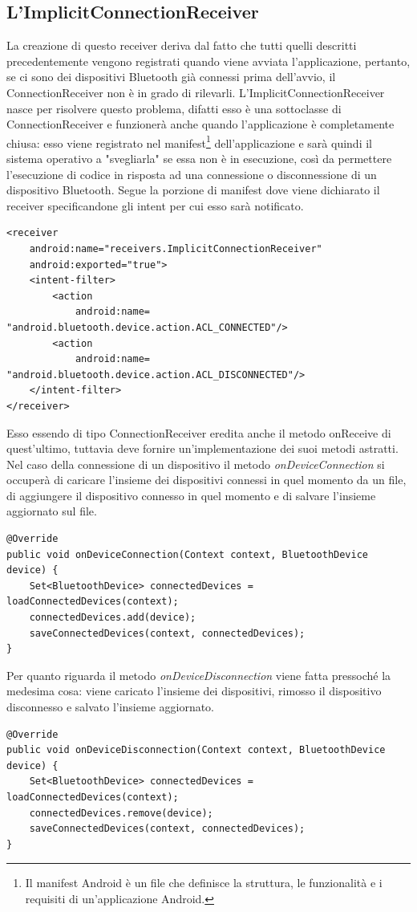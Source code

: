 \subsection{L'ImplicitConnectionReceiver}
La creazione di questo receiver deriva dal fatto che tutti quelli descritti precedentemente vengono registrati quando viene avviata l'applicazione, pertanto, se ci sono dei dispositivi Bluetooth già connessi prima dell'avvio, il ConnectionReceiver non è in grado di rilevarli. L'ImplicitConnectionReceiver nasce per risolvere questo problema, difatti esso è una sottoclasse di ConnectionReceiver e funzionerà anche quando l'applicazione è completamente chiusa: esso viene registrato nel manifest\footnote{Il manifest Android è un file che definisce la struttura, le funzionalità e i requisiti di un'applicazione Android.} dell'applicazione e sarà quindi il sistema operativo a "svegliarla" se essa non è in esecuzione, così da permettere l'esecuzione di codice in risposta ad una connessione o disconnessione di un dispositivo Bluetooth. Segue la porzione di manifest dove viene dichiarato il receiver specificandone gli intent per cui esso sarà notificato.
\begin{verbatim}
<receiver 
    android:name="receivers.ImplicitConnectionReceiver"
    android:exported="true">
    <intent-filter>
        <action 
            android:name= "android.bluetooth.device.action.ACL_CONNECTED"/>
        <action
            android:name= "android.bluetooth.device.action.ACL_DISCONNECTED"/>
    </intent-filter>
</receiver>
\end{verbatim}

Esso essendo di tipo ConnectionReceiver eredita anche il metodo onReceive di quest'ultimo, tuttavia deve fornire un'implementazione dei suoi metodi astratti. Nel caso della connessione di un dispositivo il metodo \textit{onDeviceConnection} si occuperà di caricare l'insieme dei dispositivi connessi in quel momento da un file, di aggiungere il dispositivo connesso in quel momento e di salvare l'insieme aggiornato sul file.
\begin{verbatim}
@Override
public void onDeviceConnection(Context context, BluetoothDevice device) {
    Set<BluetoothDevice> connectedDevices = loadConnectedDevices(context);
    connectedDevices.add(device);
    saveConnectedDevices(context, connectedDevices);
}
\end{verbatim}

Per quanto riguarda il metodo \textit{onDeviceDisconnection} viene fatta pressoché la medesima cosa: viene caricato l'insieme dei dispositivi, rimosso il dispositivo disconnesso e salvato l'insieme aggiornato.
\begin{verbatim}
@Override
public void onDeviceDisconnection(Context context, BluetoothDevice device) {
    Set<BluetoothDevice> connectedDevices = loadConnectedDevices(context);
    connectedDevices.remove(device);
    saveConnectedDevices(context, connectedDevices);
}
\end{verbatim}

